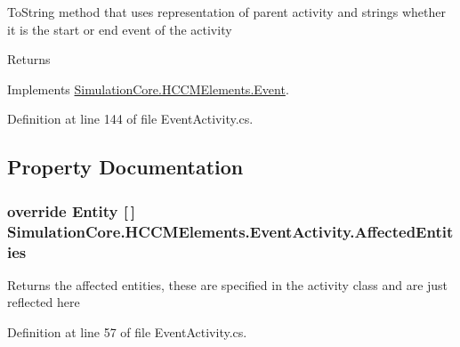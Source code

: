 To\+String method that uses representation of parent activity and strings whether it is the start or end event of the activity 

\begin{DoxyReturn}{Returns}

\end{DoxyReturn}


Implements \hyperlink{class_simulation_core_1_1_h_c_c_m_elements_1_1_event_a74668b01e4c7898939a3d98d6ee3a780}{Simulation\+Core.\+H\+C\+C\+M\+Elements.\+Event}.



Definition at line 144 of file Event\+Activity.\+cs.



\subsection{Property Documentation}
\subsubsection[{\texorpdfstring{Affected\+Entities}{AffectedEntities}}]{\setlength{\rightskip}{0pt plus 5cm}override {\bf Entity} \mbox{[}$\,$\mbox{]} Simulation\+Core.\+H\+C\+C\+M\+Elements.\+Event\+Activity.\+Affected\+Entities\hspace{0.3cm}{\ttfamily [get]}}\hypertarget{class_simulation_core_1_1_h_c_c_m_elements_1_1_event_activity_a439e12a2947b67299b977f40e9790214}{}\label{class_simulation_core_1_1_h_c_c_m_elements_1_1_event_activity_a439e12a2947b67299b977f40e9790214}


Returns the affected entities, these are specified in the activity class and are just reflected here 



Definition at line 57 of file Event\+Activity.\+cs.

